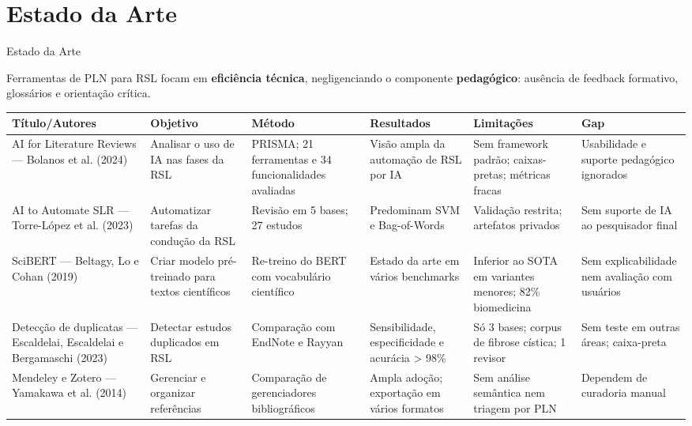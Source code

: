\documentclass[aspectratio=169]{beamer}
\begin{document}
\section{Estado da Arte}

\begin{frame}[t]{Estado da Arte}
  \scriptsize
  
  Ferramentas de PLN para RSL focam em \textbf{eficiência técnica}, negligenciando o componente \textbf{pedagógico}: ausência de feedback formativo, glossários e orientação crítica.
  
  \vspace{0.3cm}
  
\renewcommand{\arraystretch}{1.7}
  \begin{table}
    \centering
    \tiny
    \begin{tabular}{|p{2.4cm}|p{2cm}|p{2cm}|p{2cm}|p{2cm}|p{2cm}|}
      \hline
      \textbf{Título/Autores} & \textbf{Objetivo} & \textbf{Método} & \textbf{Resultados} & \textbf{Limitações} & \textbf{Gap} \\
      \hline
      AI for Literature Reviews — Bolanos et al. (2024) & Analisar o uso de IA nas fases da RSL & PRISMA; 21 ferramentas e 34 funcionalidades avaliadas & Visão ampla da automação de RSL por IA & Sem framework padrão; caixas-pretas; métricas fracas & Usabilidade e suporte pedagógico ignorados \\
      \hline
      AI to Automate SLR — Torre-López et al. (2023) & Automatizar tarefas da condução da RSL & Revisão em 5 bases; 27 estudos & Predominam SVM e Bag-of-Words & Validação restrita; artefatos privados & Sem suporte de IA ao pesquisador final \\
      \hline
      SciBERT — Beltagy, Lo e Cohan (2019) & Criar modelo pré-treinado para textos científicos & Re-treino do BERT com vocabulário científico & Estado da arte em vários benchmarks & Inferior ao SOTA em variantes menores; 82\% biomedicina & Sem explicabilidade nem avaliação com usuários \\
      \hline
      Detecção de duplicatas — Escaldelai, Escaldelai e Bergamaschi (2023) & Detectar estudos duplicados em RSL & Comparação com EndNote e Rayyan & Sensibilidade, especificidade e acurácia > 98\% & Só 3 bases; corpus de fibrose cística; 1 revisor & Sem teste em outras áreas; caixa-preta \\
      \hline
      Mendeley e Zotero — Yamakawa et al. (2014) & Gerenciar e organizar referências & Comparação de gerenciadores bibliográficos & Ampla adoção; exportação em vários formatos & Sem análise semântica nem triagem por PLN & Dependem de curadoria manual \\
      \hline
    \end{tabular}
  \end{table}
\end{frame}
\end{document}

